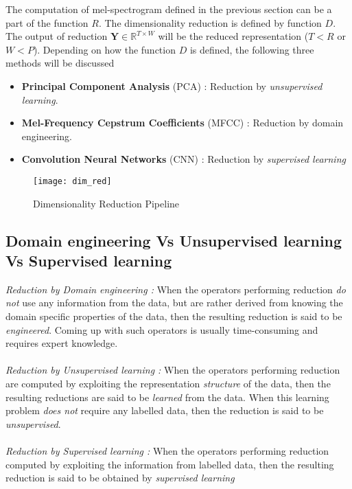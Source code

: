 \noindent The computation of mel-spectrogram defined in the previous section can be a part of the function $R$. The dimensionality reduction is defined by function $D$. The output of reduction $\textbf{Y} \in \mathbb{R}^{T \times W}$ will be the reduced representation ($T < R$ or $W < P$). Depending on how the function $D$ is defined, the following three methods will be discussed
\begin{itemize}
  \item \textbf{Principal Component Analysis} (PCA) : Reduction by \textit{unsupervised learning}.
  \item \textbf{Mel-Frequency Cepstrum Coefficients} (MFCC) : Reduction by domain engineering.
  \item \textbf{Convolution Neural Networks} (CNN) : Reduction by \textit{supervised learning}
\end{itemize} 
\begin{figure}[h] 
\centering
\texttt{[image: dim\_red]}
\caption{Dimensionality Reduction Pipeline}
 \label{fig:Dimensionality Reduction}
 \end{figure}
\FloatBarrier
\bigskip

\subsection{Domain engineering Vs Unsupervised learning Vs Supervised learning}
\textit{Reduction by Domain engineering :} When the operators performing reduction \textit{do not} use any information from the data, but are rather derived from knowing the domain specific properties of the data, then the resulting reduction is said to be \textit{engineered}. Coming up with such operators is usually time-consuming and requires expert knowledge.\\
\\
\textit{Reduction by Unsupervised learning :} When the operators performing reduction are computed by exploiting the representation \textit{structure} of the data, then the resulting reductions are said to be \textit{learned} from the data. When this learning problem \textit{does not} require any labelled data, then the reduction is said to be \textit{unsupervised}.\\
\\
\textit{Reduction by Supervised learning :} When the operators performing reduction computed by exploiting the information from labelled data, then the resulting reduction is said to be obtained by \textit{supervised learning} 

